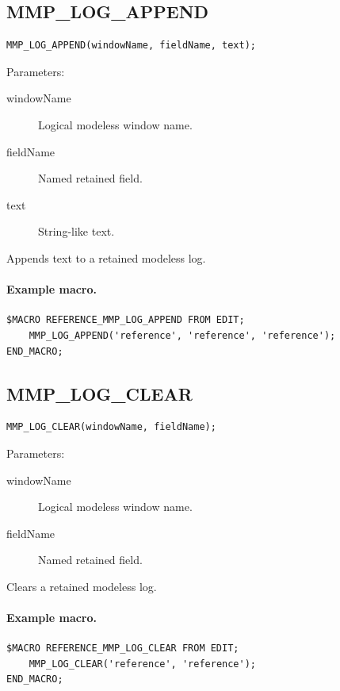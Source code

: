 \documentclass[a4paper,10pt,twoside,openany]{book}
\newenvironment{mrmacextension}{\begin{changebar}}{\end{changebar}}
\begin{document}
\begin{mrmacextension}
\label{prim:procedure-mmp-log-append}
\subsection*{MMP\_LOG\_APPEND}
\begin{verbatim}
MMP_LOG_APPEND(windowName, fieldName, text);
\end{verbatim}
Parameters:
\begin{description}
\item[windowName] Logical modeless window name.
\item[fieldName] Named retained field.
\item[text] String-like text.
\end{description}

Appends text to a retained modeless log.

\paragraph{Example macro.}
\begin{verbatim}
$MACRO REFERENCE_MMP_LOG_APPEND FROM EDIT;
    MMP_LOG_APPEND('reference', 'reference', 'reference');
END_MACRO;
\end{verbatim}
\end{mrmacextension}

\begin{mrmacextension}
\label{prim:procedure-mmp-log-clear}
\subsection*{MMP\_LOG\_CLEAR}
\begin{verbatim}
MMP_LOG_CLEAR(windowName, fieldName);
\end{verbatim}
Parameters:
\begin{description}
\item[windowName] Logical modeless window name.
\item[fieldName] Named retained field.
\end{description}

Clears a retained modeless log.

\paragraph{Example macro.}
\begin{verbatim}
$MACRO REFERENCE_MMP_LOG_CLEAR FROM EDIT;
    MMP_LOG_CLEAR('reference', 'reference');
END_MACRO;
\end{verbatim}
\end{mrmacextension}
\end{document}
